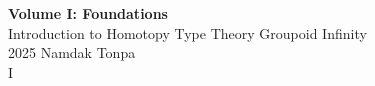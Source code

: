 \documentclass{article}
\begin{document}
\begin{titlepage}
    \centering
    \vspace*{1in}
    \Huge
    \textbf{Volume I: Foundations} \\
    \vspace{0.5in}
    \Large
    Introduction to Homotopy Type Theory
    \vfill
    \Large
    Groupoid Infinity \\
    \vspace{0.2in}
2025
    \vspace{0.5in}
    \vspace{0.5in}
    \Large
    Namdak Tonpa \\
    I
\end{titlepage}

\tableofcontents
\newif\ifincludeTOC
\includeTOCfalse

\newpage
\begin{standalone}
    
\end{standalone}
\newpage
\begin{standalone}
    
\end{standalone}
\newpage
\begin{standalone}
    
\end{standalone}
\newpage
\begin{standalone}
    
\end{standalone}
\end{document}
